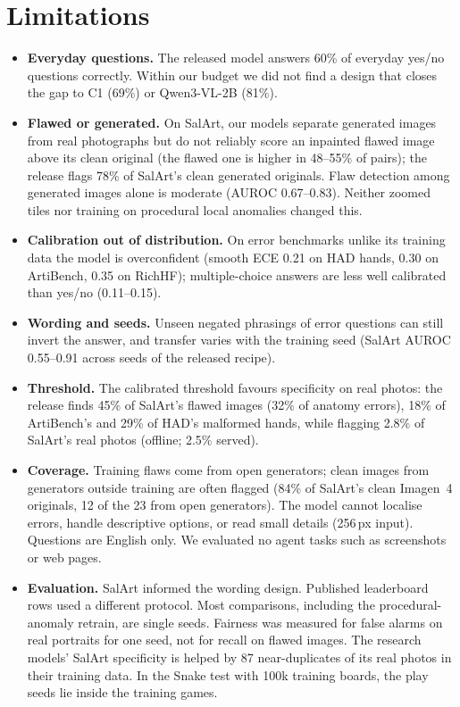 \documentclass[10pt]{article}
\begin{document}
\section{Limitations}
\begin{itemize}\setlength\itemsep{1pt}
\item \textbf{Everyday questions.} The released model answers 60\% of everyday yes/no questions correctly. Within our budget we did not find a design that closes the gap to C1 (69\%) or Qwen3-VL-2B (81\%).
\item \textbf{Flawed or generated.} On SalArt, our models separate generated images from real photographs but do not reliably score an inpainted flawed image above its clean original (the flawed one is higher in 48--55\% of pairs); the release flags 78\% of SalArt's clean generated originals. Flaw detection among generated images alone is moderate (AUROC 0.67--0.83). Neither zoomed tiles nor training on procedural local anomalies changed this.
\item \textbf{Calibration out of distribution.} On error benchmarks unlike its training data the model is overconfident (smooth ECE 0.21 on HAD hands, 0.30 on ArtiBench, 0.35 on RichHF); multiple-choice answers are less well calibrated than yes/no (0.11--0.15).
\item \textbf{Wording and seeds.} Unseen negated phrasings of error questions can still invert the answer, and transfer varies with the training seed (SalArt AUROC 0.55--0.91 across seeds of the released recipe).
\item \textbf{Threshold.} The calibrated threshold favours specificity on real photos: the release finds 45\% of SalArt's flawed images (32\% of anatomy errors), 18\% of ArtiBench's and 29\% of HAD's malformed hands, while flagging 2.8\% of SalArt's real photos (offline; 2.5\% served).
\item \textbf{Coverage.} Training flaws come from open generators; clean images from generators outside training are often flagged (84\% of SalArt's clean Imagen~4 originals, 12 of the 23 from open generators). The model cannot localise errors, handle descriptive options, or read small details (256\,px input). Questions are English only. We evaluated no agent tasks such as screenshots or web pages.
\item \textbf{Evaluation.} SalArt informed the wording design. Published leaderboard rows used a different protocol. Most comparisons, including the procedural-anomaly retrain, are single seeds. Fairness was measured for false alarms on real portraits for one seed, not for recall on flawed images. The research models' SalArt specificity is helped by 87 near-duplicates of its real photos in their training data. In the Snake test with 100k training boards, the play seeds lie inside the training games.

\end{itemize}
\end{document}
